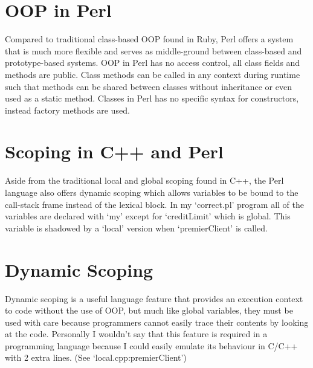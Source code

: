 \documentclass[11pt, a4paper, fleqn, oneside]{article}
\begin{document}
\section{OOP in Perl}
Compared to traditional class-based OOP found in Ruby, Perl offers a system that is much more
flexible and serves as middle-ground between class-based and prototype-based systems.
OOP in Perl has no access control, all class fields and methods are public.
Class methods can be called in any context during runtime such that methods can be shared
between classes without inheritance or even used as a static method.
Classes in Perl has no specific syntax for constructors, instead factory methods are used.

\section{Scoping in C++ and Perl}
Aside from the traditional local and global scoping found in C++, the Perl language also
offers dynamic scoping which allows variables to be bound to the call-stack frame instead
of the lexical block. In my `correct.pl' program all of the variables are declared with `my'
except for `creditLimit' which is global. This variable is shadowed by a `local' version when
`premierClient' is called.

\section{Dynamic Scoping}
Dynamic scoping is a useful language feature that provides an execution context to code without
the use of OOP, but much like global variables, they must be used with care because programmers
cannot easily trace their contents by looking at the code. Personally I wouldn't say that this
feature is required in a programming language because I could easily emulate its behaviour
in C/C++ with 2 extra lines. (See `local.cpp:premierClient')
\end{document}
